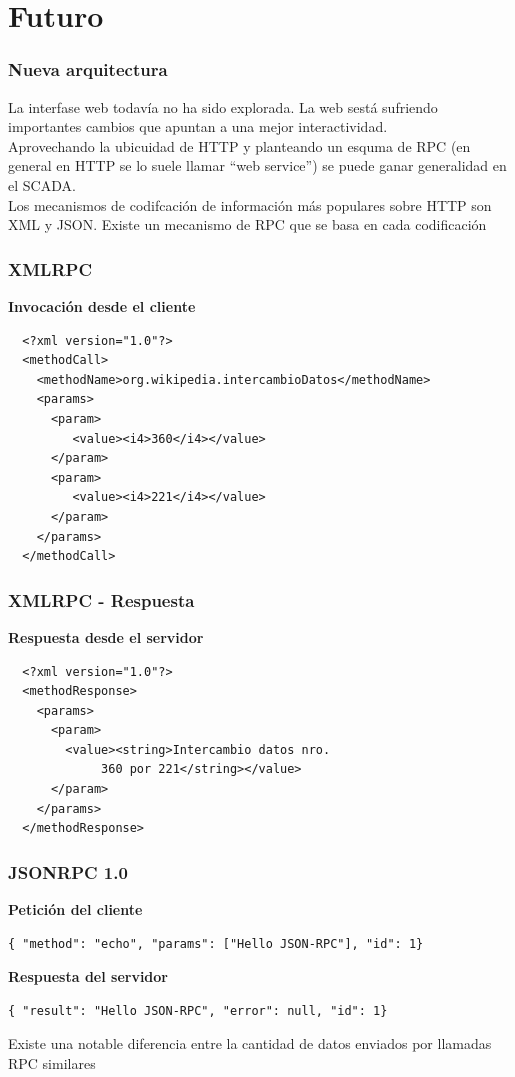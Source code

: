 \documentclass{beamer}
\begin{document}
\section{Futuro}
\begin{frame}[fragile]
  \frametitle{Nueva arquitectura}
  La interfase web todavía no ha sido explorada. La web sestá sufriendo
  importantes cambios que apuntan a una mejor interactividad.
  \pause\\
  Aprovechando la ubicuidad de HTTP y planteando un esquma de RPC (en general
  en HTTP se lo suele llamar ``web service'') se puede ganar generalidad
  en el SCADA.
  \pause\\
  Los mecanismos de codifcación de información más populares sobre HTTP son XML y JSON.
  Existe un mecanismo de RPC que se basa en cada codificación
\end{frame}

\begin{frame}[fragile]
  \frametitle{XMLRPC}
  \textbf{Invocación desde el cliente}
  \begin{verbatim}
  <?xml version="1.0"?>
  <methodCall>
    <methodName>org.wikipedia.intercambioDatos</methodName>
    <params>
      <param>
         <value><i4>360</i4></value>
      </param>
      <param>
         <value><i4>221</i4></value>
      </param>
    </params>
  </methodCall>
  \end{verbatim}
  
\end{frame}
\begin{frame}[fragile]
  \frametitle{XMLRPC - Respuesta }

\textbf{Respuesta desde el servidor}
  \begin{verbatim}
  <?xml version="1.0"?>
  <methodResponse>
    <params>
      <param>
        <value><string>Intercambio datos nro. 
             360 por 221</string></value>
      </param>
    </params>
  </methodResponse>

  \end{verbatim}
\end{frame}

\begin{frame}[fragile]
  \frametitle{JSONRPC 1.0}
  \textbf{Petición del cliente}
  \begin{verbatim}
{ "method": "echo", "params": ["Hello JSON-RPC"], "id": 1}
  \end{verbatim}
 
  \textbf{Respuesta del servidor}
  \begin{verbatim}
{ "result": "Hello JSON-RPC", "error": null, "id": 1}
  \end{verbatim}
Existe una notable diferencia entre la cantidad de datos enviados
por llamadas RPC similares
\end{frame}
\end{document}
